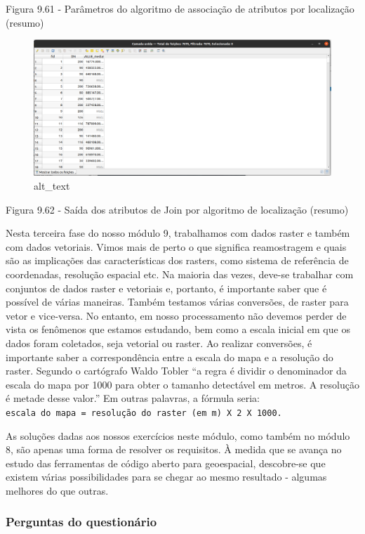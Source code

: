 \documentclass[
  portuguese,
]{krantz}
\begin{document}
Figura 9.61 - Parâmetros do algoritmo de associação de atributos por localização (resumo)

\begin{figure}
\centering
\includegraphics{media/modulo9/fig962.png}
\caption{alt\_text}
\end{figure}

Figura 9.62 - Saída dos atributos de Join por algoritmo de localização (resumo)

Nesta terceira fase do nosso módulo 9, trabalhamos com dados raster e também com dados vetoriais. Vimos mais de perto o que significa reamostragem e quais são as implicações das características dos rasters, como sistema de referência de coordenadas, resolução espacial etc. Na maioria das vezes, deve-se trabalhar com conjuntos de dados raster e vetoriais e, portanto, é importante saber que é possível de várias maneiras. Também testamos várias conversões, de raster para vetor e vice-versa. No entanto, em nosso processamento não devemos perder de vista os fenômenos que estamos estudando, bem como a escala inicial em que os dados foram coletados, seja vetorial ou raster. Ao realizar conversões, é importante saber a correspondência entre a escala do mapa e a resolução do raster. Segundo o cartógrafo Waldo Tobler ``a regra é dividir o denominador da escala do mapa por 1000 para obter o tamanho detectável em metros. A resolução é metade desse valor.'' Em outras palavras, a fórmula seria: \texttt{escala\ do\ mapa\ =\ resolução\ do\ raster\ (em\ m)\ X\ 2\ X\ 1000.}

As soluções dadas aos nossos exercícios neste módulo, como também no módulo 8, são apenas uma forma de resolver os requisitos. À medida que se avança no estudo das ferramentas de código aberto para geoespacial, descobre-se que existem várias possibilidades para se chegar ao mesmo resultado - algumas melhores do que outras.

\hypertarget{perguntas-do-questionuxe1rio-17}{%
\subsubsection{Perguntas do questionário}\label{perguntas-do-questionuxe1rio-17}}
\end{document}
